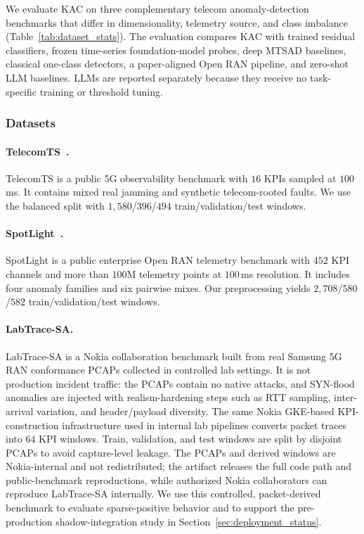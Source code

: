 \documentclass[conference]{IEEEtran}
\begin{document}
We evaluate KAC on three complementary telecom anomaly-detection benchmarks that differ in dimensionality, telemetry source, and class imbalance (Table~\ref{tab:dataset_stats}). The evaluation compares KAC with trained residual classifiers, frozen time-series foundation-model probes, deep MTSAD baselines, classical one-class detectors, a paper-aligned Open RAN pipeline, and zero-shot LLM baselines. LLMs are reported separately because they receive no task-specific training or threshold tuning.

\subsubsection{Datasets}
\label{sec:datasets}

\paragraph{TelecomTS~\cite{feng2025telecomts}.}
TelecomTS is a public 5G observability benchmark with $16$ KPIs sampled at $100$\,ms. It contains mixed real jamming and synthetic telecom-rooted faults. We use the balanced split with $1{,}580$/$396$/$494$ train/validation/test windows.

\paragraph{SpotLight~\cite{sun2024spotlight}.}
SpotLight is a public enterprise Open RAN telemetry benchmark with $452$ KPI channels and more than $100$M telemetry points at $100$\,ms resolution. It includes four anomaly families and six pairwise mixes. Our preprocessing yields $2{,}708$/$580$/$582$ train/validation/test windows.

\paragraph{LabTrace-SA.}
LabTrace-SA is a Nokia collaboration benchmark built from real Samsung 5G RAN conformance PCAPs collected in controlled lab settings. It is not production incident traffic: the PCAPs contain no native attacks, and SYN-flood anomalies are injected with realism-hardening steps such as RTT sampling, inter-arrival variation, and header/payload diversity. The same Nokia GKE-based KPI-construction infrastructure used in internal lab pipelines converts packet traces into $64$ KPI windows. Train, validation, and test windows are split by disjoint PCAPs to avoid capture-level leakage. The PCAPs and derived windows are Nokia-internal and not redistributed; the artifact releases the full code path and public-benchmark reproductions, while authorized Nokia collaborators can reproduce LabTrace-SA internally. We use this controlled, packet-derived benchmark to evaluate sparse-positive behavior and to support the pre-production shadow-integration study in Section~\ref{sec:deployment_status}.
\end{document}
